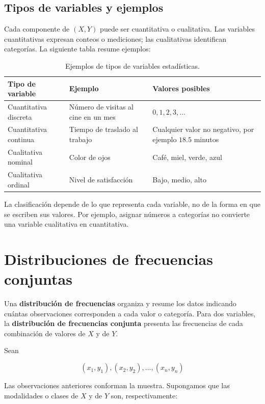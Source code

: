 \subsection{Tipos de variables y ejemplos}

Cada componente de $(X,Y)$ puede ser cuantitativa o cualitativa. Las variables cuantitativas expresan conteos o mediciones; las cualitativas identifican categorías. La siguiente tabla resume ejemplos:

\begin{table}[H]
\centering
\small
\renewcommand{\arraystretch}{1.15}
\begin{tabular}{|>{\raggedright\arraybackslash}p{4cm}|>{\raggedright\arraybackslash}p{4.1cm}|>{\raggedright\arraybackslash}p{6.3cm}|}
\hline
\textbf{Tipo de variable} & \textbf{Ejemplo} & \textbf{Valores posibles} \\ \hline
Cuantitativa discreta & Número de visitas al cine en un mes & $0,1,2,3,\ldots$ \\ \hline
Cuantitativa continua & Tiempo de traslado al trabajo & Cualquier valor no negativo, por ejemplo $18.5$ minutos \\ \hline
Cualitativa nominal & Color de ojos & Café, miel, verde, azul \\ \hline
Cualitativa ordinal & Nivel de satisfacción & Bajo, medio, alto \\ \hline
\end{tabular}
\caption{Ejemplos de tipos de variables estadísticas.}
\label{tab:tipos-variables}
\end{table}

La clasificación depende de lo que representa cada variable, no de la forma en que se escriben sus valores. Por ejemplo, asignar números a categorías no convierte una variable cualitativa en cuantitativa.

\section{Distribuciones de frecuencias conjuntas}

Una \textbf{distribución de frecuencias} organiza y resume los datos indicando cuántas observaciones corresponden a cada valor o categoría. Para dos variables, la \textbf{distribución de frecuencias conjunta} presenta las frecuencias de cada combinación de valores de $X$ y de $Y$.

Sean

$$
(x_1,y_1),(x_2,y_2),\ldots,(x_n,y_n)
$$

Las observaciones anteriores conforman la muestra. Supongamos que las modalidades o clases de $X$ y de $Y$ son, respectivamente:

